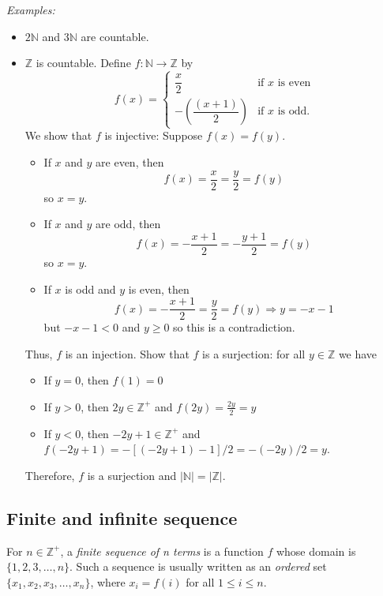 \documentclass[11pt]{article}
\begin{document}
    \emph{Examples:}
    \begin{itemize}
        \item \(2\mathbb{N}\) and \(3\mathbb{N}\) are countable.
        \item \(\mathbb{Z}\) is countable. Define \(f: \mathbb{N} \rightarrow \mathbb{Z}\) by \[f(x) = \begin{cases}
            \dfrac{x}{2} & \text{if $x$ is even} \\
            - \left(\dfrac{(x+1)}{2}\right) & \text{if $x$ is odd.}
        \end{cases}\] We show that $f$ is injective: Suppose \(f(x) = f(y)\). 
        \begin{itemize}
            \item If $x$ and $y$ are even, then \[f(x) = \frac{x}{2} = \frac{y}{2} = f(y)\] so \(x = y\).
            \item If $x$ and $y$ are odd, then \[f(x) = - \frac{x+1}{2} = - \frac{y+1}{2} = f(y)\] so \(x = y\).
            \item If $x$ is odd and $y$ is even, then \[f(x) = - \frac{x+1}{2} = \frac{y}{2} = f(y) \Rightarrow y = -x - 1\] but \(-x - 1 < 0\) and \(y \geq 0\) so this is a contradiction.
        \end{itemize}
        Thus, $f$ is an injection. Show that $f$ is a surjection: for all \(y \in \mathbb{Z}\) we have
        \begin{itemize}
            \item If \(y=0\), then \(f(1) = 0\)
            \item If \(y > 0\), then \(2y \in \mathbb{Z}^+\) and \(f(2y) = \frac{2y}{2} = y\)
            \item If \(y<0\), then \(-2y + 1 \in \mathbb{Z}^+\) and \(f(-2y + 1) = -[(-2y+1) - 1]/2 = -(-2y)/2 = y.\)
        \end{itemize}
        Therefore, $f$ is a surjection and \(|\mathbb{N}| = |\mathbb{Z}|\). 
    \end{itemize}

    \subsection{Finite and infinite sequence}

    For \(n \in \mathbb{Z}^+\), a \emph{finite sequence of n terms} is a function $f$ whose domain is \(\{1,2,3,\dots, n\}\). Such a sequence is usually written as an \emph{ordered} set \(\{x_1, x_2, x_3, \dots, x_n\}\), where \(x_i = f(i)\) for all \(1 \leq i \leq n\). 
\end{document}
